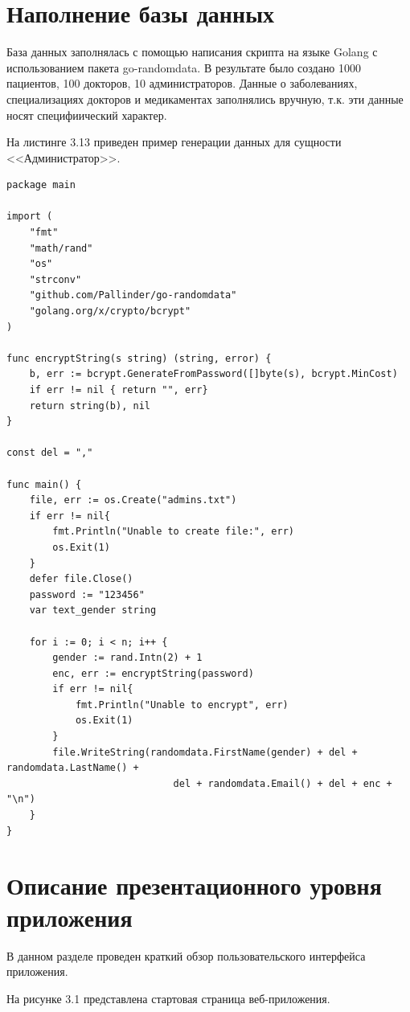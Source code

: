 \section*{Наполнение базы данных}

База данных заполнялась с помощью написания скрипта на языке Golang с использованием пакета go-randomdata\cite{randomdata}. В результате было создано 1000 пациентов, 100 докторов, 10 администраторов. Данные о заболеваниях, специализациях докторов и медикаментах заполнялись вручную, т.к. эти данные носят специфиический характер.

\clearpage

На листинге 3.13 приведен пример генерации данных для сущности <<Администратор>>.

\begin{lstlisting}[caption={Пример генерации данных для администратора}]
package main

import (
	"fmt"
	"math/rand"
	"os"
	"strconv"
	"github.com/Pallinder/go-randomdata"
	"golang.org/x/crypto/bcrypt"
)

func encryptString(s string) (string, error) {
	b, err := bcrypt.GenerateFromPassword([]byte(s), bcrypt.MinCost)
	if err != nil { return "", err}
	return string(b), nil
}

const del = ","

func main() {
	file, err := os.Create("admins.txt")
	if err != nil{
        fmt.Println("Unable to create file:", err) 
        os.Exit(1) 
    }
    defer file.Close() 
	password := "123456"
	var text_gender string
	
	for i := 0; i < n; i++ {
		gender := rand.Intn(2) + 1
		enc, err := encryptString(password)
		if err != nil{
            fmt.Println("Unable to encrypt", err) 
            os.Exit(1) 
        }
		file.WriteString(randomdata.FirstName(gender) + del + randomdata.LastName() +
							 del + randomdata.Email() + del + enc + "\n")
	}
}
\end{lstlisting}

\clearpage

\section{Описание презентационного уровня приложения}

В данном разделе проведен краткий обзор пользовательского интерфейса приложения.

На рисунке 3.1 представлена стартовая страница веб-приложения. 

